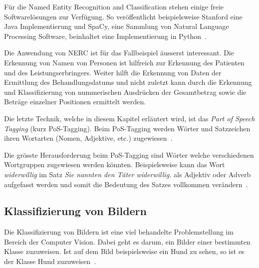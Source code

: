 Für die Named Entity Recognition and Classification stehen einige freie Softwarelösungen zur Verfügung. So veröffentlicht beispielsweise Stanford eine Java Implementierung und SpaCy, eine Sammlung von Natural Language Processing Software, beinhaltet eine Implementierung in Python~\autocite{StanfordNLPGroup, ExplosionAI}.

Die Anwendung von NERC ist für das Fallbeispiel äusserst interessant. Die Erkennung von Namen von Personen ist hilfreich zur Erkennung des Patienten und des Leistungserbringers. Weiter hilft die Erkennung von Daten der Ermittlung des Behandlungsdatums und nicht zuletzt kann durch die Erkennung und Klassifizierung von nummerischen Ausdrücken der Gesamtbetrag sowie die Beträge einzelner Positionen ermittelt werden.

Die letzte Technik, welche in diesem Kapitel erläutert wird, ist das \textit{Part of Speech Tagging} (kurz PoS-Tagging). Beim PoS-Tagging werden Wörter und Satzzeichen ihren Wortarten (Nomen, Adjektive, etc.) zugewiesen~\autocite{Xiao2004}.

Die grösste Herausforderung beim PoS-Tagging sind Wörter welche verschiedenen Wortgruppen zugewiesen werden könnten. Beispielsweise kann das Wort \textit{widerwillig} im Satz \textit{Sie nannten den Täter widerwillig.} als Adjektiv oder Adverb aufgefasst werden und somit die Bedeutung des Satzes vollkommen verändern~\autocite{Volk}.




\subsection{Klassifizierung von Bildern}
\label{chap:object-detection}

Die Klassifizierung von Bildern ist eine viel behandelte Problemstellung im Bereich der Computer Vision. Dabei geht es darum, ein Bilder einer bestimmten Klasse zuzuweisen. Ist auf dem Bild beispielsweise ein Hund zu sehen, so ist es der Klasse Hund zuzuweisen~\autocite{Goodfellow2016}.

